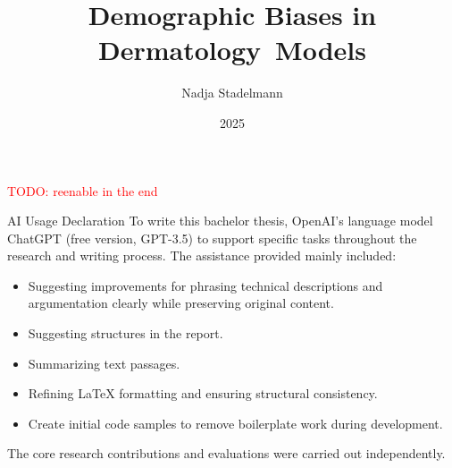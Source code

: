 \documentclass[12pt, a4paper, oneside]{book}   	%
\author{Nadja Stadelmann}                       %
\title{Demographic Biases in Dermatology~Models}   %
\subtitle{\large}               %
\date{2025}                                     %
\renewcommand{\todo}[1]{\textcolor{red}{TODO: #1}}
\begin{document}
	\english                                        %
	\maketitle
	
	\todo{reenable in the end}
	
	
	
	\begin{abstractstyle}{AI Usage Declaration}
	\noindent
	To write this bachelor thesis, OpenAI’s language model ChatGPT (free version, GPT-3.5) to support specific tasks throughout the research and writing process. The assistance provided mainly included:
	
	\begin{itemize}
		\item Suggesting improvements for phrasing technical descriptions and argumentation clearly while preserving original content.
		\item Suggesting structures in the report.
		\item Summarizing text passages.
		\item Refining LaTeX formatting and ensuring structural 	consistency.
		\item Create initial code samples to remove boilerplate work during development.
	\end{itemize}
	\noindent
	The core research contributions and evaluations were carried out independently.
	\end{abstractstyle}
	
\end{document}
